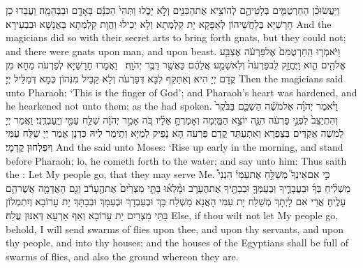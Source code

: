 {וַיַּעֲשׂוּ\maqqaf כֵ֨ן הַחַרְטֻמִּ֧ים בְּלָטֵיהֶ֛ם לְהוֹצִ֥יא אֶת\maqqaf הַכִּנִּ֖ים וְלֹ֣א יָכֹ֑לוּ וַתְּהִי֙ הַכִּנָּ֔ם בָּאָדָ֖ם וּבַבְּהֵמָֽה׃}
{וַעֲבַדוּ כֵן חָרָשַׁיָּא בְּלַחֲשֵׁיהוֹן לְאַפָּקָא יָת קַלְמְתָא וְלָא יְכִילוּ וַהֲוָת קַלְמְתָא בַּאֲנָשָׁא וּבִבְעִירָא׃}
{And the magicians did so with their secret arts to bring forth gnats, but they could not; and there were gnats upon man, and upon beast.}{}
{וַיֹּאמְר֤וּ הַֽחַרְטֻמִּם֙ אֶל\maqqaf פַּרְעֹ֔ה אֶצְבַּ֥ע אֱלֹהִ֖ים הִ֑וא וַיֶּחֱזַ֤ק לֵב\maqqaf פַּרְעֹה֙ וְלֹֽא\maqqaf שָׁמַ֣ע אֲלֵהֶ֔ם כַּאֲשֶׁ֖ר דִּבֶּ֥ר יְהֹוָֽה׃ \setuma }
{וַאֲמַרוּ חָרָשַׁיָּא לְפַרְעֹה מַחָא מִן קֳדָם יְיָ הִיא וְאִתַּקַּף לִבָּא דְּפַרְעֹה וְלָא קַבֵּיל מִנְּהוֹן כְּמָא דְּמַלֵּיל יְיָ׃}
{Then the magicians said unto Pharaoh: ‘This is the finger of God’; and Pharaoh’s heart was hardened, and he hearkened not unto them; as the \lord\space had spoken.}{}
{וַיֹּ֨אמֶר יְהֹוָ֜ה אֶל\maqqaf מֹשֶׁ֗ה הַשְׁכֵּ֤ם בַּבֹּ֙קֶר֙ וְהִתְיַצֵּב֙ לִפְנֵ֣י פַרְעֹ֔ה הִנֵּ֖ה יוֹצֵ֣א הַמָּ֑יְמָה וְאָמַרְתָּ֣ אֵלָ֗יו כֹּ֚ה אָמַ֣ר יְהֹוָ֔ה שַׁלַּ֥ח עַמִּ֖י וְיַֽעַבְדֻֽנִי׃}
{וַאֲמַר יְיָ לְמֹשֶׁה אַקְדֵּים בְּצַפְרָא וְאִתְעַתַּד קֳדָם פַּרְעֹה הָא נָפֵיק לְמַיָּא וְתֵימַר לֵיהּ כִּדְנָן אֲמַר יְיָ שַׁלַּח עַמִּי וְיִפְלְחוּן קֳדָמָי׃}
{And the \lord\space said unto Moses: ‘Rise up early in the morning, and stand before Pharaoh; lo, he cometh forth to the water; and say unto him: Thus saith the \lord: Let My people go, that they may serve Me.}{}
{כִּ֣י אִם\maqqaf אֵינְךָ֮ מְשַׁלֵּ֣חַ אֶת\maqqaf עַמִּי֒ הִנְנִי֩ מַשְׁלִ֨יחַ בְּךָ֜ וּבַעֲבָדֶ֧יךָ וּֽבְעַמְּךָ֛ וּבְבָתֶּ֖יךָ אֶת\maqqaf הֶעָרֹ֑ב וּמָ֨לְא֜וּ בָּתֵּ֤י מִצְרַ֙יִם֙ אֶת\maqqaf הֶ֣עָרֹ֔ב וְגַ֥ם הָאֲדָמָ֖ה אֲשֶׁר\maqqaf הֵ֥ם עָלֶֽיהָ׃}
{אֲרֵי אִם לָיְתָךְ מְשַׁלַּח יָת עַמִּי הָאֲנָא מַשְׁלַח בָּךְ וּבְעַבְדָךְ וּבְעַמָּךְ וּבְבָתָּךְ יָת עָרוֹבָא וְיִתְמְלוֹן בָּתֵּי מִצְרַיִם יָת עָרוֹבָא וְאַף אַרְעָא דְּאִנּוּן עֲלַהּ׃}
{Else, if thou wilt not let My people go, behold, I will send swarms of flies upon thee, and upon thy servants, and upon thy people, and into thy houses; and the houses of the Egyptians shall be full of swarms of flies, and also the ground whereon they are.}{}
